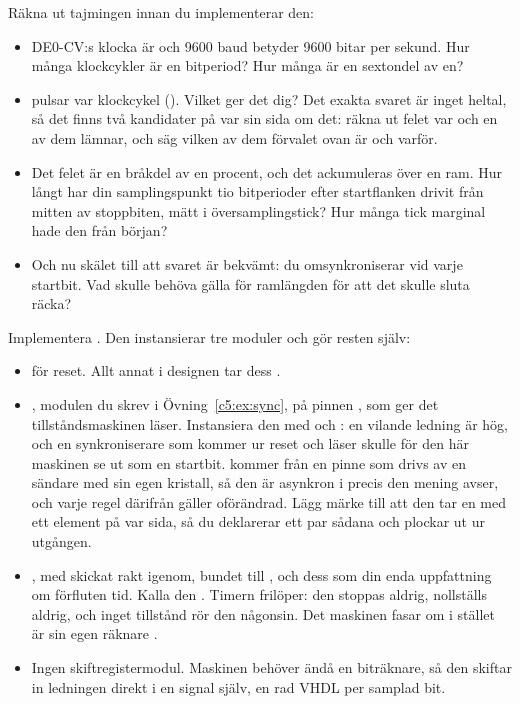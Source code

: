  Räkna ut tajmingen innan du implementerar den:
\begin{itemize}
  \item DE0-CV:s klocka är  och 9600 baud betyder 9600 bitar per sekund. Hur många
    klockcykler är en bitperiod? Hur många är en sextondel av en?
  \item {} pulsar var  klockcykel (). Vilket
     ger det dig? Det exakta svaret är inget heltal, så det finns två
    kandidater på var sin sida om det: räkna ut felet var och en av dem lämnar, och säg vilken av
    dem förvalet ovan är och varför.
  \item Det felet är en bråkdel av en procent, och det ackumuleras över en ram. Hur långt har din
    samplingspunkt tio bitperioder efter startflanken drivit från mitten av stoppbiten, mätt i
    översamplingstick? Hur många tick marginal hade den från början?
  \item Och nu skälet till att svaret är bekvämt: du omsynkroniserar vid varje startbit. Vad skulle
    behöva gälla för ramlängden för att det skulle sluta räcka?
\end{itemize}

 Implementera . Den instansierar tre moduler och gör resten själv:
\begin{itemize}
  \item {} för reset. Allt annat i designen tar dess .
  \item \textbf{}, modulen du skrev i Övning~\ref{c5:ex:sync}, på pinnen , som
    ger det  tillståndsmaskinen läser. Instansiera den med  och
    : en vilande ledning är hög, och en synkroniserare som kommer ur reset och
    läser  skulle för den här maskinen se ut som en startbit.  kommer från en
    pinne som drivs av en sändare med sin egen kristall, så den är asynkron i precis den mening
     avser, och varje regel därifrån gäller oförändrad. Lägg märke till att den tar
    en  med ett element på var sida, så du deklarerar ett par sådana och
    plockar ut  ur utgången.
  \item {}, med  skickat rakt igenom,  bundet
    till , och dess  som din enda uppfattning om förfluten tid. Kalla den
    . Timern frilöper: den stoppas aldrig, nollställs aldrig, och inget tillstånd rör
    den någonsin. Det maskinen fasar om i stället är sin egen räknare .
  \item Ingen skiftregistermodul. Maskinen behöver ändå en biträknare, så den skiftar in ledningen
    direkt i en signal  själv, en rad VHDL per samplad bit.
\end{itemize}

